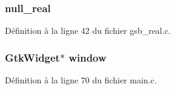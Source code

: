 \subsubsection[{null\_\-real}]{ {\bf null\_\-real}}\label{gsb__currency_8c_a26f304bec3fdc0651b9aa8765d4de3c6}


Définition à la ligne 42 du fichier gsb\_\-real.c.

\subsubsection[{window}]{\setlength{\rightskip}{0pt plus 5cm}GtkWidget$\ast$ {\bf window}}\label{gsb__currency_8c_a3d346c08cf2d67c388caabffb412b293}


Définition à la ligne 70 du fichier main.c.

